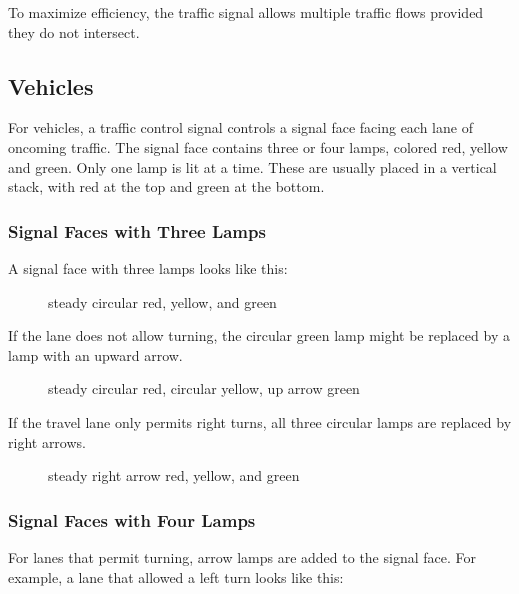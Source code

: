 \documentclass[letterpaper,twoside]{article}
\begin{document}
To maximize efficiency, the traffic signal allows multiple traffic flows
provided they do not intersect.

\subsection{Vehicles}
For vehicles, a traffic control signal controls a signal face facing each
lane of oncoming traffic.  The signal face contains three or four lamps,
colored red, yellow and green.  Only one lamp is lit at a time.
These are usually placed in a vertical stack, with red at the top and green
at the bottom.

\subsubsection{Signal Faces with Three Lamps}

A signal face with three lamps looks like this:

\begin{figure}[H]
           {\caption{steady circular red, yellow, and
               green}\label{fig:three_A}}
\end{figure}

If the lane does not allow turning, the circular
green lamp might be replaced by a lamp with an upward arrow.

\begin{figure}[H]
           {\caption{steady circular red, circular yellow, up arrow
               green}\label{fig:three_B}}
\end{figure}

If the travel lane only permits right turns, all three circular lamps
are replaced by right arrows.

\begin{figure}[H]
           {\caption{steady right arrow red, yellow, and
               green}\label{fig:three_C}}
\end{figure}

\subsubsection{Signal Faces with Four Lamps}

For lanes that permit turning, arrow lamps are added to the signal face.
For example, a lane that allowed a left turn looks like this:
\end{document}
